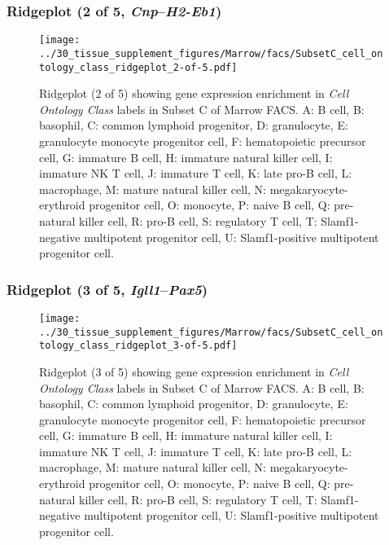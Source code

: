 \subsubsection{Ridgeplot (2 of 5, \emph{Cnp}--\emph{H2-Eb1})}
\begin{figure}[h]
\centering
\texttt{[image: ../30\_tissue\_supplement\_figures/Marrow/facs/SubsetC\_cell\_ontology\_class\_ridgeplot\_2-of-5.pdf]}

\caption{ Ridgeplot (2 of 5)  showing gene expression enrichment in \emph{Cell Ontology Class} labels in Subset C of Marrow FACS. A: B cell, B: basophil, C: common lymphoid progenitor, D: granulocyte, E: granulocyte monocyte progenitor cell, F: hematopoietic precursor cell, G: immature B cell, H: immature natural killer cell, I: immature NK T cell, J: immature T cell, K: late pro-B cell, L: macrophage, M: mature natural killer cell, N: megakaryocyte-erythroid progenitor cell, O: monocyte, P: naive B cell, Q: pre-natural killer cell, R: pro-B cell, S: regulatory T cell, T: Slamf1-negative multipotent progenitor cell, U: Slamf1-positive multipotent progenitor cell.}
\end{figure}


\clearpage

\subsubsection{Ridgeplot (3 of 5, \emph{Igll1}--\emph{Pax5})}
\begin{figure}[h]
\centering
\texttt{[image: ../30\_tissue\_supplement\_figures/Marrow/facs/SubsetC\_cell\_ontology\_class\_ridgeplot\_3-of-5.pdf]}

\caption{ Ridgeplot (3 of 5)  showing gene expression enrichment in \emph{Cell Ontology Class} labels in Subset C of Marrow FACS. A: B cell, B: basophil, C: common lymphoid progenitor, D: granulocyte, E: granulocyte monocyte progenitor cell, F: hematopoietic precursor cell, G: immature B cell, H: immature natural killer cell, I: immature NK T cell, J: immature T cell, K: late pro-B cell, L: macrophage, M: mature natural killer cell, N: megakaryocyte-erythroid progenitor cell, O: monocyte, P: naive B cell, Q: pre-natural killer cell, R: pro-B cell, S: regulatory T cell, T: Slamf1-negative multipotent progenitor cell, U: Slamf1-positive multipotent progenitor cell.}
\end{figure}


\clearpage

